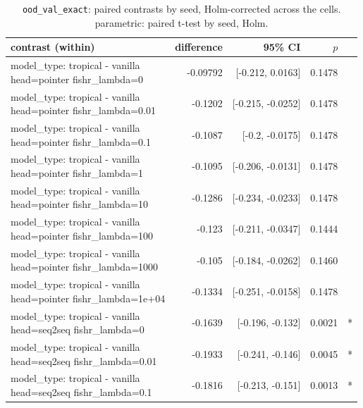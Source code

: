 \documentclass[10pt]{article}
\makeatletter
\newcommand{\stackcell}[1]{\begin{tabular}[t]{@{}l@{}}#1\end{tabular}}
\makeatother
\begin{document}
{\small
\begin{longtable}{lrrrl}
\caption{\texttt{ood\_val\_exact}: paired contrasts by seed, Holm-corrected across the cells. parametric: paired t-test by seed, Holm.}\label{tab:paired-ood_val_exact}\\
\toprule
contrast (within) & difference & 95\% CI & $p$ & \\
\midrule
\endhead
\stackcell{model\_type: tropical - vanilla\\\footnotesize head=pointer fishr\_lambda=0 } & -0.09792 & [-0.212, 0.0163] & 0.1478 & \\
\stackcell{model\_type: tropical - vanilla\\\footnotesize head=pointer fishr\_lambda=0.01 } & -0.1202 & [-0.215, -0.0252] & 0.1478 & \\
\stackcell{model\_type: tropical - vanilla\\\footnotesize head=pointer fishr\_lambda=0.1 } & -0.1087 & [-0.2, -0.0175] & 0.1478 & \\
\stackcell{model\_type: tropical - vanilla\\\footnotesize head=pointer fishr\_lambda=1 } & -0.1095 & [-0.206, -0.0131] & 0.1478 & \\
\stackcell{model\_type: tropical - vanilla\\\footnotesize head=pointer fishr\_lambda=10 } & -0.1286 & [-0.234, -0.0233] & 0.1478 & \\
\stackcell{model\_type: tropical - vanilla\\\footnotesize head=pointer fishr\_lambda=100 } & -0.123 & [-0.211, -0.0347] & 0.1444 & \\
\stackcell{model\_type: tropical - vanilla\\\footnotesize head=pointer fishr\_lambda=1000 } & -0.105 & [-0.184, -0.0262] & 0.1460 & \\
\stackcell{model\_type: tropical - vanilla\\\footnotesize head=pointer fishr\_lambda=1e+04 } & -0.1334 & [-0.251, -0.0158] & 0.1478 & \\
\stackcell{model\_type: tropical - vanilla\\\footnotesize head=seq2seq fishr\_lambda=0 } & -0.1639 & [-0.196, -0.132] & 0.0021 & *\\
\stackcell{model\_type: tropical - vanilla\\\footnotesize head=seq2seq fishr\_lambda=0.01 } & -0.1933 & [-0.241, -0.146] & 0.0045 & *\\
\stackcell{model\_type: tropical - vanilla\\\footnotesize head=seq2seq fishr\_lambda=0.1 } & -0.1816 & [-0.213, -0.151] & 0.0013 & *\\

\end{longtable}}
\end{document}
